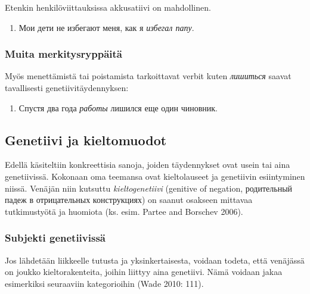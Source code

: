 \documentclass[]{scrartcl}
\providecommand{\tightlist}{%
  \setlength{\itemsep}{0pt}\setlength{\parskip}{0pt}}
\begin{document}
Etenkin henkilöviittauksissa akkusatiivi on mahdollinen.

\begin{enumerate}
\def\labelenumi{(\arabic{enumi})}
\setcounter{enumi}{57}
\tightlist
\item
  Мои дети не избегают меня, как я \emph{избегал папу}.
\end{enumerate}

\subsubsection{Muita
merkitysryppäitä}\label{muita-merkitysryppuxe4ituxe4}

Myös menettämistä tai poistamista tarkoittavat verbit kuten
\emph{лишиться} saavat tavallisesti genetiivitäydennyksen:

\begin{enumerate}
\def\labelenumi{(\arabic{enumi})}
\setcounter{enumi}{58}
\tightlist
\item
  Спустя два года \emph{работы} лишился еще один чиновник.
\end{enumerate}

\subsection{Genetiivi ja kieltomuodot}\label{genetiivi-ja-kieltomuodot}

Edellä käsiteltiin konkreettisia sanoja, joiden täydennykset ovat usein
tai aina genetiivissä. Kokonaan oma teemansa ovat kieltolauseet ja
genetiivin esiintyminen niissä. Venäjän niin kutsuttu
\emph{kieltogenetiivi} (genitive of negation, родительный падеж в
отрицательных конструкциях) on saanut osakseen mittavaa tutkimustyötä ja
huomiota (ks. esim. Partee and Borschev 2006).

\subsubsection{Subjekti genetiivissä}\label{subjekti-genetiivissuxe4}

Jos lähdetään liikkeelle tutusta ja yksinkertaisesta, voidaan todeta,
että venäjässä on joukko kieltorakenteita, joihin liittyy aina
genetiivi. Nämä voidaan jakaa esimerkiksi seuraaviin kategorioihin (Wade
2010: 111).
\end{document}

